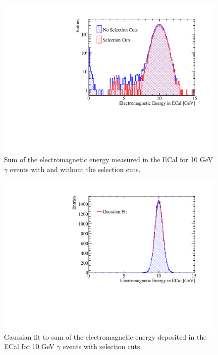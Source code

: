 \begin{figure}
\includegraphics[width=\largefigwidth]{EnergyEstimators/Plots/Calibration/EMScaleSetting/EMScaleECalSelection.pdf}
\caption[Sum of the electromagnetic energy measured in the ECal for 10 GeV $\gamma$ events with and without the selection cuts.]{Sum of the electromagnetic energy measured in the ECal for 10 GeV $\gamma$ events with and without the selection cuts.}
\label{fig:ecalemscaleselection}
\end{figure}

\begin{figure}
\includegraphics[width=\largefigwidth]{EnergyEstimators/Plots/Calibration/EMScaleSetting/EMScaleSettingECalFit.pdf}
\caption[Gaussian fit to sum of the electromagnetic energy deposited in the ECal for 10 GeV $\gamma$ events with selection cuts.]{Gaussian fit to sum of the electromagnetic energy deposited in the ECal for 10 GeV $\gamma$ events with selection cuts.}
\label{fig:ecalemscalefit}
\end{figure}

